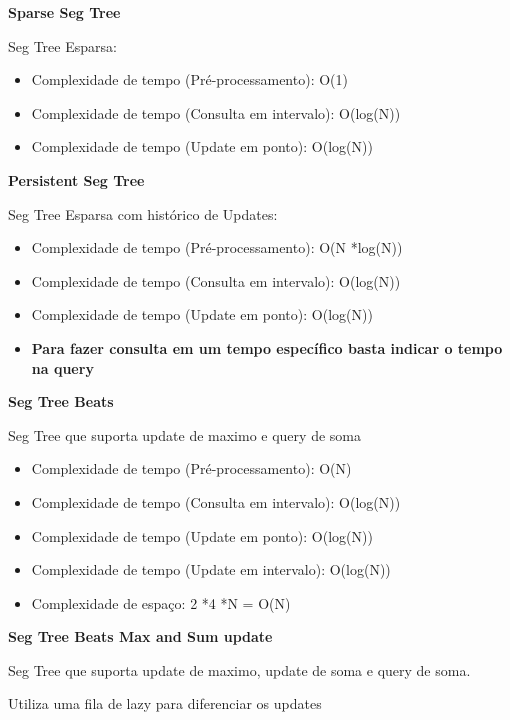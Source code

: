\documentclass[11pt, a4paper, oneside]{book}
\begin{document}
\textbf{Sparse Seg Tree} 

Seg Tree Esparsa:



\begin{itemize}
\item Complexidade de tempo (Pré-processamento): O(1)
\item Complexidade de tempo (Consulta em intervalo): O(log(N))
\item Complexidade de tempo (Update em ponto): O(log(N))
\end{itemize}



\textbf{Persistent Seg Tree} 

Seg Tree Esparsa com histórico de Updates:



\begin{itemize}
\item Complexidade de tempo (Pré-processamento): O(N *log(N))
\item Complexidade de tempo (Consulta em intervalo): O(log(N))
\item Complexidade de tempo (Update em ponto): O(log(N))
\item \textbf{Para fazer consulta em um tempo específico basta indicar o tempo na query}
\end{itemize}



\textbf{Seg Tree Beats} 

Seg Tree que suporta update de maximo e query de soma



\begin{itemize}
\item Complexidade de tempo (Pré-processamento): O(N)
\item Complexidade de tempo (Consulta em intervalo): O(log(N))
\item Complexidade de tempo (Update em ponto): O(log(N))
\item Complexidade de tempo (Update em intervalo): O(log(N))
\item Complexidade de espaço: 2 *4 *N = O(N)
\end{itemize}



\textbf{Seg Tree Beats Max and Sum update} 

Seg Tree que suporta update de maximo, update de soma e query de soma.

Utiliza uma fila de lazy para diferenciar os updates
\end{document}
